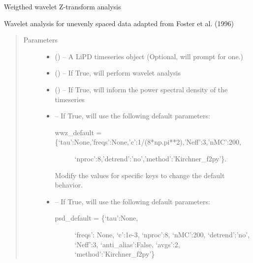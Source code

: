 \documentclass[letterpaper,10pt,english]{sphinxmanual}
\begin{document}
\begin{fulllineitems}
\label{\detokenize{Main:pyleoclim.wwzTs}}
Weigthed wavelet Z-transform analysis

Wavelet analysis for unevenly spaced data adapted from Foster et al. (1996)
\begin{quote}\begin{description}
\item[{Parameters}] \leavevmode\begin{itemize}
\item {} 
 () -- A LiPD timeseries object (Optional, will prompt for one.)

\item {} 
 () -- If True, will perform wavelet analysis

\item {} 
 () -- If True, will inform the power spectral density of the timeseries

\item {} 
 -- 
If True, will use the following default parameters:
\begin{description}
\item[{wwz\_default = \{`tau':None,'freqs':None,'c':1/(8*np.pi**2),'Neff':3,'nMC':200,}] \leavevmode
`nproc':8,'detrend':'no','method':'Kirchner\_f2py'\}.

\end{description}

Modify the values for specific keys to change the default behavior.


\item {} 
 -- 
If True, will use the following default parameters:
\begin{description}
\item[{psd\_default = \{`tau':None,}] \leavevmode
`freqs': None,
`c':1e-3,
`nproc':8,
`nMC':200,
`detrend':'no',
`Neff':3,
`anti\_alias':False,
`avgs':2,
`method':'Kirchner\_f2py'\}

\end{description}


\end{itemize}
\end{description}
\end{quote}
\end{fulllineitems}
\end{document}
